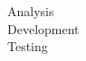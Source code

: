 \documentclass[preview]{standalone}
\begin{document}
Analysis\\Development\\Testing\\
\end{document}

